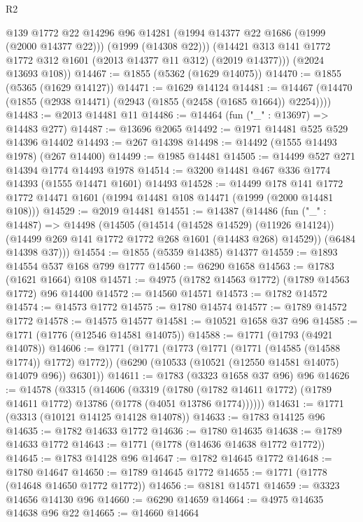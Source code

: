 \begin{lexlean}{R2}
\begin{coremodule}
          @139
          @1772
          @22
          @14296
          @96
          @14281
          (@1994 @14377 @22 @1686 (@1999 (@2000 @14377 @22)))
          (@1999 (@14308 @22)))
        (@14421 @313 @141 @1772 @1772 @312 @1601 (@2013 @14377 @11 @312) (@2019 @14377)))
      (@2024 @13693 @108))
@14467 := @1855 (@5362 (@1629 @14075))
@14470 := @1855 (@5365 (@1629 @14127))
@14471 := @1629 @14124
@14481 := @14467 (@14470 (@1855 (@2938 @14471) (@2943 (@1855 (@2458 (@1685 @1664)) @2254))))
@14483 := @2013 @14481 @11
@14486 := @14464 (fun ("_" : @13697) => @14483 @277)
@14487 := @13696 @2065
@14492 := @1971 @14481 @525 @529 @14396 @14402
@14493 := @267 @14398
@14498 := @14492 (@1555 @14493 @1978) (@267 @14400)
@14499 := @1985 @14481
@14505 := @14499 @527 @271 @14394 @1774 @14493 @1978
@14514 := @3200 @14481 @467 @336 @1774 @14393 (@1555 @14471 @1601) @14493
@14528 := @14499
    @178
    @141
    @1772
    @1772
    @14471
    @1601
    (@1994 @14481 @108 @14471 (@1999 (@2000 @14481 @108)))
@14529 := @2019 @14481
@14551 := @14387
    (@14486
      (fun ("_" : @14487) =>
      @14498
        (@14505
          (@14514 (@14528 @14529) (@11926 @14124))
          (@14499 @269 @141 @1772 @1772 @268 @1601 (@14483 @268) @14529))
        (@6484 @14398 @37)))
@14554 := @1855 (@5359 @14385) @14377
@14559 := @1893 @14554 @537 @168 @799 @1777
@14560 := @6290 @1658
@14563 := @1783 (@1621 @1664) @108
@14571 := @4975 (@1782 @14563 @1772) (@1789 @14563 @1772) @96 @14400
@14572 := @14560 @14571
@14573 := @1782 @14572
@14574 := @14573 @1772
@14575 := @1780 @14574
@14577 := @1789 @14572 @1772
@14578 := @14575 @14577
@14581 := @10521 @1658 @37 @96
@14585 := @1771 (@1776 (@12546 @14581 @14075))
@14588 := @1771 (@1793 (@4921 @14078))
@14606 := @1771
    (@1771
      (@1773 (@1771 (@1771 (@14585 (@14588 @1774)) @1772) @1772))
      (@6290 (@10533 (@10521 (@12550 @14581 @14075) @14079 @96)) @6301))
@14611 := @1783 (@3323 @1658 @37 @96) @96
@14626 := @14578
    (@3315
      (@14606
        (@3319
          (@1780 (@1782 @14611 @1772) (@1789 @14611 @1772) @13786 (@1778 (@4051 @13786 @1774))))))
@14631 := @1771 (@3313 (@10121 @14125 @14128 @14078))
@14633 := @1783 @14125 @96
@14635 := @1782 @14633 @1772
@14636 := @1780 @14635
@14638 := @1789 @14633 @1772
@14643 := @1771 (@1778 (@14636 @14638 @1772 @1772))
@14645 := @1783 @14128 @96
@14647 := @1782 @14645 @1772
@14648 := @1780 @14647
@14650 := @1789 @14645 @1772
@14655 := @1771 (@1778 (@14648 @14650 @1772 @1772))
@14656 := @8181 @14571
@14659 := @3323 @14656 @14130 @96
@14660 := @6290 @14659
@14664 := @4975 @14635 @14638 @96 @22
@14665 := @14660 @14664

\end{coremodule}
\end{lexlean}
